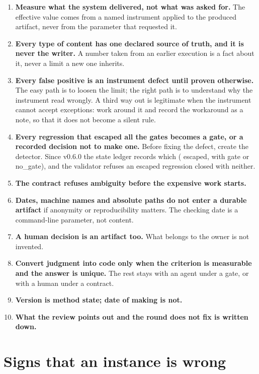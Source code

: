 \documentclass[
  american,
  10pt,
]{report}
\providecommand{\tightlist}{%
  \setlength{\itemsep}{0pt}\setlength{\parskip}{0pt}}
\renewcommand{\texttt}[1]{{\ttfamily\hyphenchar\font=-1 #1}}
\begin{document}
\begin{enumerate}
\def\labelenumi{\arabic{enumi}.}
\tightlist
\item
  \textbf{Measure what the system delivered, not what was asked for.}
  The effective value comes from a named instrument applied to the
  produced artifact, never from the parameter that requested it.
\item
  \textbf{Every type of content has one declared source of truth, and it
  is never the writer.} A number taken from an earlier execution is a
  fact about it, never a limit a new one inherits.
\item
  \textbf{Every false positive is an instrument defect until proven
  otherwise.} The easy path is to loosen the limit; the right path is to
  understand why the instrument read wrongly. A third way out is
  legitimate when the instrument cannot accept exceptions: work around
  it and record the workaround as a note, so that it does not become a
  silent rule.
\item
  \textbf{Every regression that escaped all the gates becomes a gate, or
  a recorded decision not to make one.} Before fixing the defect, create
  the detector. Since v0.6.0 the state ledger records which
  (\texttt{escaped}, with \texttt{gate} or
  \texttt{no\_\allowbreak{}gate}), and the validator refuses an escaped
  regression closed with neither.
\item
  \textbf{The contract refuses ambiguity before the expensive work
  starts.}
\item
  \textbf{Dates, machine names and absolute paths do not enter a durable
  artifact} if anonymity or reproducibility matters. The checking date
  is a command-line parameter, not content.
\item
  \textbf{A human decision is an artifact too.} What belongs to the
  owner is not invented.
\item
  \textbf{Convert judgment into code only when the criterion is
  measurable and the answer is unique.} The rest stays with an agent
  under a gate, or with a human under a contract.
\item
  \textbf{Version is method state; date of making is not.}
\item
  \textbf{What the review points out and the round does not fix is
  written down.}
\end{enumerate}

\section{Signs that an instance is
wrong}\label{signs-that-an-instance-is-wrong}
\end{document}
